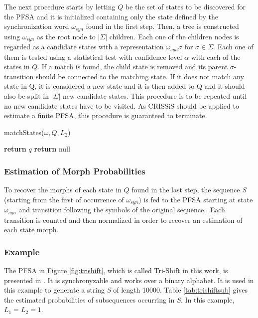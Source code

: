 {The next procedure starts by letting $Q$ be the set of states to be discovered for the PFSA and it is initialized containing only the state defined by the synchronization word $\omega_{syn}$ found in the first step. Then, a tree is constructed using $\omega_{syn}$ as the root node to $|\Sigma|$ children. Each one of the children nodes is regarded as a candidate states with a representation $\omega_{syn}\sigma$ for $\sigma\in\Sigma$. Each one of them is tested using a statistical test with confidence level $\alpha$ with each of the states in $Q$. If a match is found, the child state is removed and its parent $\sigma$-transition should be connected to the matching state. If it does not match any state in Q, it is considered a new state and it is then added to Q and it should also be split in $|\Sigma|$ new candidate states. This procedure is to be repeated until no new candidate states have to be visited. As CRISSiS should be applied to estimate a finite PFSA, this procedure is guaranteed to terminate. 

\begin{algorithm}[t]
\caption{matchStates($\omega, Q, L_2$)\label{alg:matchstates}}
\begin{algorithmic}[1]
					\State \textbf{return} $q$
				\EndIf
			\EndFor
		\EndFor
	\EndFor
	\State \textbf{return} null
\end{algorithmic}
\end{algorithm}

\subsubsection{Estimation of Morph Probabilities}

To recover the morphs of each state in $Q$ found in the last step, the sequence \textit{S} (starting from the first of occurrence of $\omega_{syn}$) is fed to the PFSA starting at state $\omega_{syn}$ and transition following the symbols of the original sequence.. Each transition is counted and then normalized in order to recover an estimation of each state morph.

\subsubsection{Example}

The PFSA in Figure \ref{fig:trishift}, which is called Tri-Shift in this work, is presented in \citep{asok.11}. It is synchronyzable and works over a binary alphabet. It is used in this example to generate a string \textit{S} of length 10000. Table \ref{tab:trishiftsub} gives the estimated probabilities of subsequences occurring in \textit{S}. In this example, $L_1 = L_2 = 1$.

}
